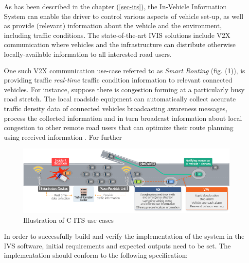 \documentclass[main.tex]{subfiles}
\begin{document}
As has been described in the chapter (\ref{sec-its}), the In-Vehicle Information System can enable 
the driver to control various aspects of vehicle set-up, as well as provide (relevant) information about 
the vehicle and the environment, including traffic conditions. The state-of-the-art IVIS solutions include 
V2X communication where vehicles and the infrastructure can distribute otherwise locally-available 
information to all interested road users. 

One such V2X communication use-case referred to as \emph{Smart Routing} (fig.
(\ref{cits-ivis})), is providing traffic \emph{real-time} traffic condition information to
relevant connected vehicles. For instance, suppose there is congestion forming at a
particularly busy road stretch. The local roadside equipment can automatically collect accurate
traffic density data of connected vehicles broadcasting awareness messages, process the
collected information and in turn broadcast information about local congestion to other remote
road users that can optimize their route planning using received information
\cite{Kotsi2020}. For further 

\begin{figure}[htbp]
    \centering
    \includegraphics[width=.8\textwidth]{cits-ivis.png}
    \caption{Illustration of C-ITS use-cases}
    \label{cits-ivis}
\end{figure}

In order to successfully build and verify the implementation of the system in the IVS software, 
initial requirements and expected outputs need to be set. The implementation should conform to 
the following specification:
\end{document}
